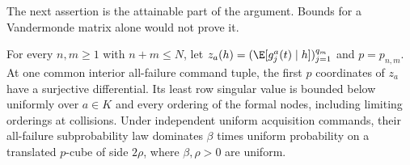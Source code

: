 The next assertion is the attainable part of the argument. Bounds for a
Vandermonde matrix alone would not prove it.

\begin{lemma}\label{lem:newton-attainment}
For every $n,m\ge1$ with $n+m\le N$, let
$z_a(h)=(\E[g_j^a(t)\mid h])_{j=1}^{q_m}$ and
$p=p_{n,m}$. At one common interior all-failure command tuple, the first
$p$ coordinates of $z_a$ have a surjective differential. Its least row
singular value is bounded below uniformly over $a\in K$ and every
ordering of the formal nodes, including limiting orderings at collisions.
Under independent uniform acquisition commands, their all-failure
subprobability law dominates $\beta$ times uniform probability on a
translated $p$-cube of side $2\rho$, where $\beta,\rho>0$ are uniform.
\end{lemma}
